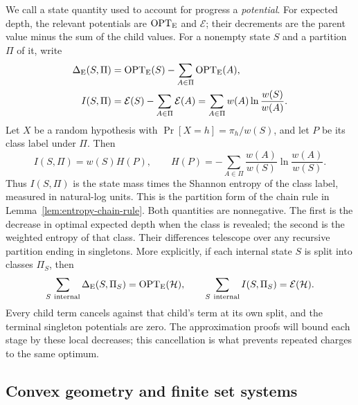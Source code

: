 We call a state quantity used to account for progress a
\emph{potential}. For expected depth, the relevant potentials
are $\operatorname{OPT}_{\mathrm E}$ and $\mathcal E$; their decrements are the
parent value minus the sum of the child values.
For a nonempty state $S$ and a partition $\Pi$ of it, write
\[
 \begin{split}
  \Delta_{\mathrm E}(S,\Pi)&=\operatorname{OPT}_{\mathrm E}(S)
                     -\sum_{A\in\Pi}\operatorname{OPT}_{\mathrm E}(A),\\
  I(S,\Pi)&=\mathcal E(S)-\sum_{A\in\Pi}\mathcal E(A)
           =\sum_{A\in\Pi}w(A)\ln\frac{w(S)}{w(A)}.
  \end{split}
 \]
  Let $X$ be a random hypothesis with
 $\Pr[X=h]=\pi_h/w(S)$, and let $P$ be its class label under $\Pi$.
 Then
 \[
  I(S,\Pi)=w(S)H(P),\qquad
  H(P)=-\sum_{A\in\Pi}\frac{w(A)}{w(S)}
                          \ln\frac{w(A)}{w(S)}.
 \]
 Thus $I(S,\Pi)$ is the state mass times the Shannon entropy of the
 class label, measured in natural-log units. This is the partition
 form of the chain rule in Lemma~\ref{lem:entropy-chain-rule}.
 Both quantities are nonnegative. The first is the decrease in
optimal expected depth when the class is revealed; the second is
the weighted entropy of that class. Their differences telescope
over any recursive partition ending in singletons. More explicitly,
if each internal state $S$ is split into classes $\Pi_S$, then
\[
 \sum_{S\ {\rm internal}}\Delta_{\mathrm E}(S,\Pi_S)
       =\operatorname{OPT}_{\mathrm E}(\mathcal H),\qquad
 \sum_{S\ {\rm internal}}I(S,\Pi_S)=\mathcal E(\mathcal H).
\]
Every child term cancels against that child's term at its own split,
and the terminal singleton potentials are zero. The approximation
proofs will bound each stage by these local decreases; this
cancellation is what prevents repeated charges to the same optimum.

\subsection{Convex geometry and finite set systems}

